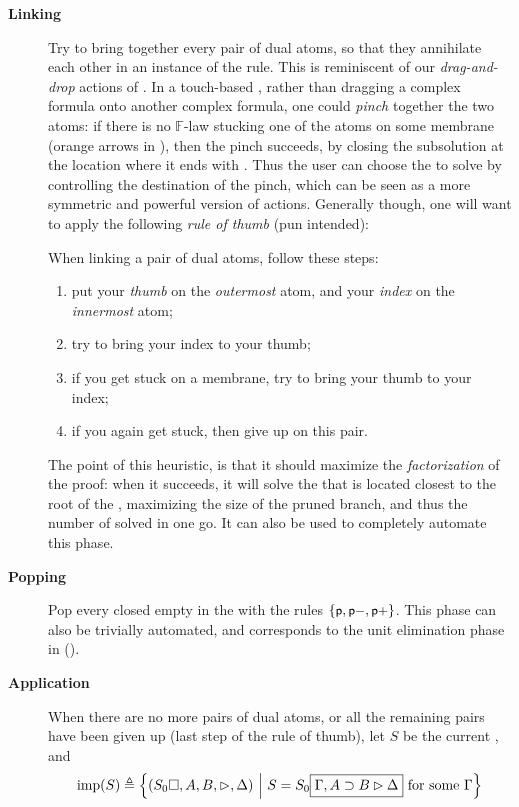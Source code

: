 \begin{description}
  \item[\textbf{Linking}] Try to bring together every pair of dual atoms, so
    that they annihilate each other in an instance of the 
    rule. This is reminiscent of our \emph{drag-and-drop} actions of
    . In a touch-based , rather than dragging a complex formula
    onto another complex formula, one could \emph{pinch} together the two atoms:
    if there is no $\mathbb{F}$-law stucking one of the atoms on some membrane
    (orange arrows in ), then the pinch succeeds, by
    closing the subsolution at the location where it ends with
    . Thus the user can choose the  to solve by
    controlling the destination of the pinch, which can be seen as a more
    symmetric and powerful version of  actions. Generally though, one will
    want to apply the following \emph{rule of thumb} (pun intended):
    \begin{fact}
      When linking a pair of dual atoms, follow these steps:
      \begin{enumerate}
        \item put your \emph{thumb} on the \emph{outermost} atom, and your
              \emph{index} on the \emph{innermost} atom;
        \item try to bring your index to your thumb;
        \item if you get stuck on a membrane, try to bring your thumb to your
              index;
        \item if you again get stuck, then give up on this pair.
      \end{enumerate}
    \end{fact}
    The point of this heuristic, is that it should maximize the
    \emph{factorization} of the proof: when it succeeds, it will solve the
     that is located closest to the root of the , maximizing the size
    of the pruned branch, and thus the number of  solved in one go. It
    can also be used to completely automate this phase.

  \item[\textbf{Popping}] Pop every closed empty  in the  with the
  rules $\{\text{\small$\mathsf{p}$},\text{\small$\mathsf{p{-}}$},\text{\small$\mathsf{p{+}}$}\}$. This phase can also be trivially
  automated, and corresponds to the unit elimination phase in 
  ().

  \item[\textbf{Application}] When there are no more pairs of dual atoms, or all
    the remaining pairs have been given up (last step of the rule of thumb), let
    $S$ be the current , and
    $$\mathrm{imp}(S) \triangleq \left\{(S_0\square, A, B, \mathbin{\rhd}, \Delta) ~\middle|~ S = S_0\fbox{$\Gamma,
          A \supset B \mathbin{\rhd} \Delta$} \text{ for some $\Gamma$}\right\}$$


\end{description}
